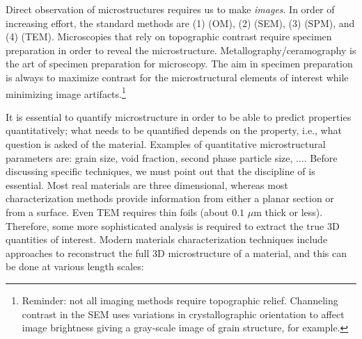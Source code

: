 Direct observation of microstructures requires us to make \textit{images}. In order of increasing effort, the standard methods are (1)  (OM), (2)  (SEM),  (3)  (SPM), and (4)  (TEM).  Microscopies that rely on topographic contrast require specimen preparation in order to reveal the microstructure.  Metallography/ceramography is the art of specimen preparation for microscopy.  The aim in specimen preparation is always to maximize contrast for the microstructural elements of interest while minimizing image artifacts.\footnote{Reminder: not all imaging methods require topographic relief.  Channeling contrast in the SEM uses variations in crystallographic orientation to affect image brightness giving a gray-scale image of grain structure, for example.}

It is essential to quantify microstructure in order to be able to predict properties quantitatively; what needs to be quantified depends on the property, i.e., what question is asked of the material. Examples of quantitative microstructural parameters are: grain size, void fraction, second phase particle size, $\ldots$.  Before discussing specific techniques, we must point out that the discipline of  is essential.  Most real materials are three dimensional, whereas most characterization methods provide information from either a planar section or from a surface. Even TEM requires thin foils (about $0.1$ $\mu$m thick or less). Therefore, some more sophisticated analysis is required to extract the true 3D quantities of interest. Modern materials characterization techniques include approaches to reconstruct the full 3D microstructure of a material, and this can be done at various length scales:

